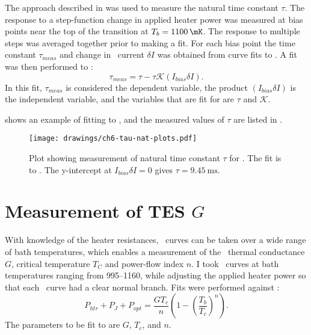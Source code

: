 
The approach described in  was used to measure the natural time constant $\tau$.
The response to a step-function change in applied heater power was measured at bias points near the top of the transition at $T_{b} = \SI{1100}{\mK}$.
The response to multiple steps was averaged together prior to making a fit.
For each bias point the time constant $\tau_{meas}$ and change in \TES\ current $\delta I$ was obtained from curve fits to .
A fit was then performed to :
\begin{equation} \label{eqn:tau-nat-fit}
  \tau_{meas} = \tau - \tau \mathcal{K} (I_{bias} \delta I).
\end{equation}
In this fit, $\tau_{meas}$ is considered the dependent variable, the product $(I_{bias} \delta I)$ is the independent variable, and the variables that are fit for are $\tau$ and $\mathcal{K}$.

 shows an example of fitting to , and the measured values of $\tau$ are listed in .

\begin{figure*}
  \centering
\texttt{[image: drawings/ch6-tau-nat-plots.pdf]}
\caption[Plot showing measurement of natural time constant $\tau$]{
  Plot showing measurement of natural time constant $\tau$ for . The fit is to .
  The y-intercept at $I_{bias} \delta I = 0$ gives $\tau = \SI{9.45}{\ms}$.
} 
\label{fig:tau-nat-plots}
\end{figure*}

\section{Measurement of \textsc{TES} $G$} \label{sec:g-psat}

%
%

With knowledge of the heater resistances, \IV\ curves can be taken over a wide range of bath temperatures, which enables a measurement of the \TES\ thermal conductance $G$, critical temperature $T_C$ and power-flow index $n$.
I took \IV\ curves at bath temperatures ranging from \SIrange{995}{1160}{\mK}, while adjusting the applied heater power so that each \IV\ curve had a clear normal branch.
Fits were performed against :
\begin{equation}\label{eqn:g-fit}
P_{htr} + P_J + P_{opt}= \frac{G T_c}{n}\left(1 - \left(\frac{T_b}{T_c}\right)^n\right).
\end{equation}
The parameters to be fit to are $G$, $T_c$, and $n$.

